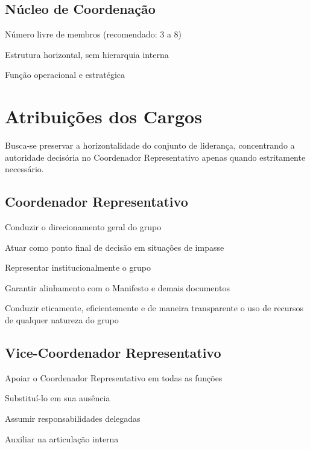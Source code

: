 \documentclass[
  12pt,          %
  a4paper,       %
  oneside,       %
  brazil         %
]{article}
\begin{document}
\subsection{Núcleo de Coordenação}

\begin{conduta}
	\item Número livre de membros (recomendado: 3 a 8)
	\item Estrutura horizontal, sem hierarquia interna
	\item Função operacional e estratégica
\end{conduta}

\section{Atribuições dos Cargos}

Busca-se preservar a horizontalidade do conjunto de liderança, concentrando a autoridade decisória no Coordenador Representativo 
apenas quando estritamente necessário.

\subsection{Coordenador Representativo}

\begin{conduta}
	\item Conduzir o direcionamento geral do grupo
	\item Atuar como ponto final de decisão em situações de impasse
	\item Representar institucionalmente o grupo
	\item Garantir alinhamento com o Manifesto e demais documentos
	\item Conduzir eticamente, eficientemente e de maneira transparente o uso de recursos de qualquer natureza do grupo
\end{conduta}

\subsection{Vice-Coordenador Representativo}

\begin{conduta}
	\item Apoiar o Coordenador Representativo em todas as funções
	\item Substituí-lo em sua ausência
	\item Assumir responsabilidades delegadas
	\item Auxiliar na articulação interna
\end{conduta}
\end{document}
